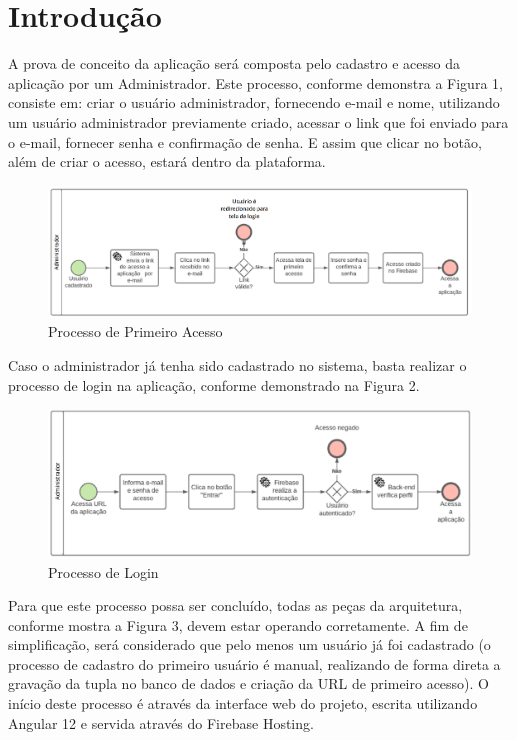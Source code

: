 \chapter[Introdução]{Introdução}
A prova de conceito da aplicação será composta pelo cadastro e acesso da aplicação por um Administrador. Este processo, conforme demonstra a Figura 1, consiste em: criar o usuário administrador, fornecendo e-mail e nome, utilizando um usuário administrador previamente criado, acessar o link que foi enviado para o e-mail, fornecer senha e confirmação de senha. E assim que clicar no botão, além de criar o acesso, estará dentro da plataforma.

\begin{figure}[htb]
    \centering
	\includegraphics[width=16cm]{imagens/PrimeiroAcesso.png}
	\caption{Processo de Primeiro Acesso}
\end{figure}
\FloatBarrier

Caso o administrador já tenha sido cadastrado no sistema, basta realizar o processo de login na aplicação, conforme demonstrado na Figura 2.

\begin{figure}[htb]
    \centering
	\includegraphics[width=16cm]{imagens/Login.png}
	\caption{Processo de Login}
\end{figure}
\FloatBarrier


Para que este processo possa ser concluído, todas as peças da arquitetura, conforme mostra a Figura 3, devem estar operando corretamente. A fim de simplificação, será considerado que pelo menos um usuário já foi cadastrado (o processo de cadastro do primeiro usuário é manual, realizando de forma direta a gravação da tupla no banco de dados e criação da URL de primeiro acesso). O início deste processo é através da interface web do projeto, escrita utilizando Angular 12 e servida através do Firebase Hosting.

